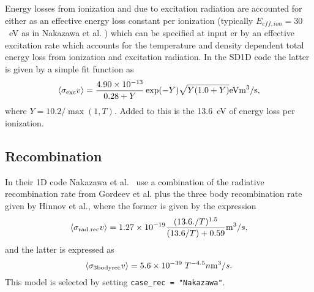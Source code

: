 \documentclass[amsmath,amssymb,a4]{revtex4}
\begin{document}
Energy losses from ionization and due to excitation radiation are accounted for either as an effective energy loss constant per ionization (typically $E_{eff,ion} = 30$~eV as in Nakazawa et al. \cite{nakazawa2000}) which can be specified at input er by an effective excitation rate which accounts for the temperature and density dependent total energy loss from ionization and excitation radiation. In the SD1D code the latter is given by a simple fit function as
\begin{equation}\label{excitation_SD1D}
    \langle\sigma_{\rm exc} v\rangle = {4.90 \times 10^{-13} \over 0.28 + Y} \exp(-Y) \sqrt{Y (1.0 + Y)} {\rm eV} {\rm m}^3/{\rm s},
\end{equation}
where $Y = 10.2 / \max( 1, T)$. Added to this is the 13.6~eV of energy loss per ionization.



\subsection{Recombination}

In their 1D code Nakazawa et al.~\cite{nakazawa2000} use a combination of the radiative recombination rate from Gordeev et al. plus the three body recombination rate given by Hinnov et al., where the former is given by the expression~\cite{gordeev1977}
\begin{equation}\label{radiative_recombination}
    \langle\sigma_{\rm rad.rec} v\rangle = 1.27 \times 10^{-19} {(13.6./T)^{1.5} \over (13.6/T) + 0.59} {\rm m}^3 / s,
\end{equation}
and the latter is expressed as~\cite{hinnov1962}
\begin{equation}\label{three_body_recombination}
    \langle\sigma_{\rm 3bodyrec} v\rangle = 5.6 \times 10^{-39} \; T^{-4.5} n {\rm m}^3 / s.
\end{equation}
This model is selected by setting {\tt case\_rec = "Nakazawa"}.
\end{document}
